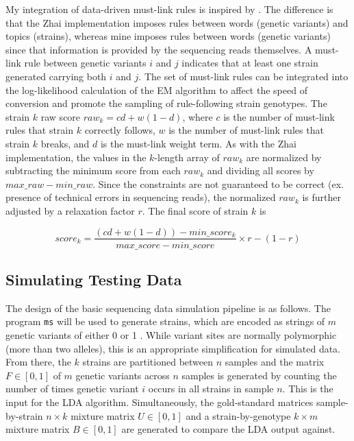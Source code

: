 \documentclass{article}
\newcommand{\code}[1]{\texttt{#1}}
\begin{document}
My integration of data-driven must-link rules is inspired by \cite{Zhai2011}. The difference is that the Zhai implementation imposes rules between words (genetic variants) and topics (strains), whereas mine imposes rules between words (genetic variants) since that information is provided by the sequencing reads themselves. A must-link rule between genetic variants $i$ and $j$ indicates that at least one strain generated carrying both $i$ and $j$. The set of must-link rules can be integrated into the log-likelihood calculation of the EM algorithm to affect the speed of conversion and promote the sampling of rule-following strain genotypes. The strain $k$ raw score $raw_k = cd + w(1 - d)$, where $c $ is the number of must-link rules that strain $k$ correctly follows, $w$ is the number of must-link rules that strain $k$ breaks, and $d$ is the must-link weight term. As with the Zhai implementation, the values in the $k$-length array of $raw_k$ are normalized by subtracting the minimum score from each $raw_k$ and dividing all scores by $max\_raw - min\_raw$. Since the constraints are not guaranteed to be correct (ex. presence of technical errors in sequencing reads), the normalized $raw_k$ is further adjusted by a relaxation factor $r$. The final score of strain $k$ is 

\[ score_k = \frac{(cd + w(1 - d)) - min\_score_k}{max\_score - min\_score} \times r - (1 - r) \]
 
\subsection{Simulating Testing Data} \label{Simulate}

The design of the basic sequencing data simulation pipeline is as follows. The program \code{ms} will be used to generate strains, which are encoded as strings of $m$ genetic variants of either 0 or 1 \cite{Hudson2002}. While variant sites are normally polymorphic (more than two alleles), this is an appropriate simplification for simulated data. From there, the $k$ strains are partitioned between $n$ samples and the matrix $F \in [0,1]$ of $m$ genetic variants across $n$ samples is generated by counting the number of times genetic variant $i$ occurs in all strains in sample $n$. This is the input for the LDA algorithm. Simultaneously, the gold-standard matrices sample-by-strain $n \times k$ mixture matrix $U \in [0,1]$ and a strain-by-genotype $k \times m$ mixture matrix $B \in [0,1]$ are generated to compare the LDA output against. 
\end{document}
